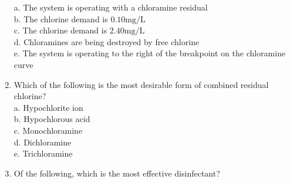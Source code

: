\documentclass{article}
\begin{document}
\begin{enumerate}
a. The system is operating with a chloramine residual\\
b. The chlorine demand is $0.10 \mathrm{mg} / \mathrm{L}$\\
c. The chlorine demand is $2.40 \mathrm{mg} / \mathrm{L}$\\
d. Chloramines are being destroyed by free chlorine\\
e. The system is operating to the right of the breakpoint on the chloramine curve\\
 \item Which of the following is the most desirable form of combined residual chlorine?\\
a. Hypochlorite ion\\
b. Hypochlorous acid\\
c. Monochloramine\\
d. Dichloramine\\
e. Trichloramine\\

  \item Of the following, which is the most effective disinfectant?\\


\end{enumerate}
\end{document}
